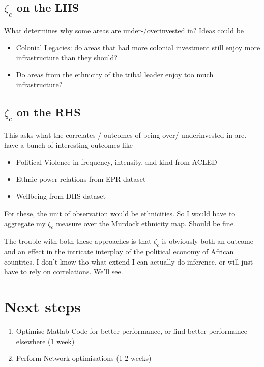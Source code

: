 \documentclass[11pt, oneside]{article}   	%
\begin{document}
\subsection{$\zeta_{c}$ on the LHS}
What determines why some areas are under-/overinvested in? Ideas could be
\begin{itemize}
  \item Colonial Legacies: do areas that had more colonial investment still enjoy more infrastructure than they should?
  \item Do areas from the ethnicity of the tribal leader enjoy too much infrastructure?
\end{itemize}

\subsection{$\zeta_{c}$ on the RHS}
This asks what the correlates / outcomes of being over/-underinvested in are. \cite{michalopoulos_long-run_2016} have a bunch of interesting outcomes like
\begin{itemize}
  \item Political Violence in frequency, intensity, and kind from ACLED
  \item Ethnic power relations from EPR dataset
  \item Wellbeing from DHS dataset
\end{itemize}

For these, the unit of observation would be ethnicities. So I would have to aggregate my $\zeta_{c}$ measure over the Murdock ethnicity map. Should be fine.

The trouble with both these approaches is that $\zeta_{c}$ is obviously both an outcome and an effect in the intricate interplay of the political economy of African countries. I don't know tho what extend I can actually do inference, or will just have to rely on correlations. We'll see.


\section{Next steps}

\begin{enumerate}
  \item Optimise Matlab Code for better performance, or find better performance elsewhere (1 week)
  \item Perform Network optimisations (1-2 weeks)
\end{enumerate}
\end{document}

